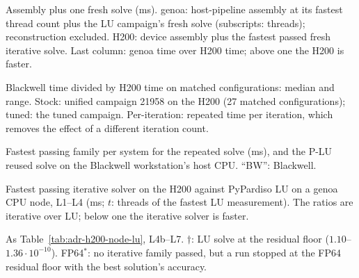 \documentclass[10pt,a4paper]{article}
\newcommand{\ADRResultsPath}{..}
\begin{document}
\begin{table}[ht]
\centering\scriptsize

\caption{Assembly plus one fresh solve (ms). genoa: host-pipeline assembly at its fastest thread count plus the LU campaign's fresh solve (subscripts: threads); reconstruction excluded. H200: device assembly plus the fastest passed fresh iterative solve. Last column: genoa time over H200 time; above one the H200 is faster.}
\label{tab:adr-h200-e2e}
\end{table}

\clearpage
\begin{table}[ht]
\centering\small
\resizebox{\linewidth}{!}{}
\caption{Blackwell time divided by H200 time on matched configurations: median and range. Stock: unified campaign 21958 on the H200 (27 matched configurations); tuned: the tuned campaign. Per-iteration: repeated time per iteration, which removes the effect of a different iteration count.}
\label{tab:adr-h200-summary}
\end{table}

\begin{table}[ht]
\centering\scriptsize

\caption{Fastest passing family per system for the repeated solve (ms), and the P-LU reused solve on the Blackwell workstation's host CPU. ``BW'': Blackwell.}
\label{tab:adr-h200-family}
\end{table}

\begin{table}[ht]
\centering\scriptsize
\resizebox{\linewidth}{!}{}
\caption{Fastest passing iterative solver on the H200 against PyPardiso LU on a genoa CPU node, L1--L4 (ms; $t$: threads of the fastest LU measurement). The ratios are iterative over LU; below one the iterative solver is faster.}
\label{tab:adr-h200-node-lu}
\end{table}

\begin{table}[ht]
\centering\scriptsize
\resizebox{\linewidth}{!}{}
\caption{As Table~\ref{tab:adr-h200-node-lu}, L4b--L7. $\dagger$: LU solve at the residual floor ($1.10$--$1.36\cdot10^{-10}$). FP64$^*$: no iterative family passed, but a run stopped at the FP64 residual floor with the best solution's accuracy.}
\label{tab:adr-h200-node-lu-large}
\end{table}
\end{document}
